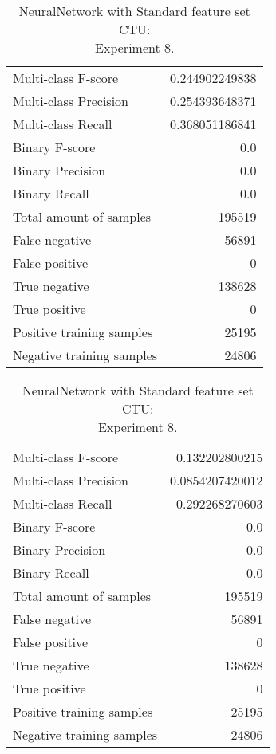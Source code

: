 \begin{table}[H]
\begin{minipage}{0.5\textwidth}
\caption{NeuralNetwork with Standard feature set CTU: \\Experiment 7.}
\centering
\begin{tabular}{l r}
\toprule
Multi-class F-score & 0.244902249838 \\
Multi-class Precision & 0.254393648371 \\
Multi-class Recall & 0.368051186841 \\
\midrule
Binary F-score & 0.0 \\
Binary Precision & 0.0 \\
Binary Recall & 0.0 \\
\midrule
Total amount of samples & 195519 \\
False negative & 56891 \\
False positive & 0 \\
True negative & 138628 \\
True positive & 0 \\
\midrule
Positive training samples & 25195 \\
Negative training samples & 24806 \\
\bottomrule
\end{tabular}
\end{minipage}
\hfillx
\begin{minipage}{0.5\textwidth}
\caption{NeuralNetwork with Standard feature set CTU: \\Experiment 8.}
\centering
\begin{tabular}{l r}
\toprule
Multi-class F-score & 0.132202800215 \\
Multi-class Precision & 0.0854207420012 \\
Multi-class Recall & 0.292268270603 \\
\midrule
Binary F-score & 0.0 \\
Binary Precision & 0.0 \\
Binary Recall & 0.0 \\
\midrule
Total amount of samples & 195519 \\
False negative & 56891 \\
False positive & 0 \\
True negative & 138628 \\
True positive & 0 \\
\midrule
Positive training samples & 25195 \\
Negative training samples & 24806 \\
\bottomrule
\end{tabular}
\end{minipage}
\end{table}
